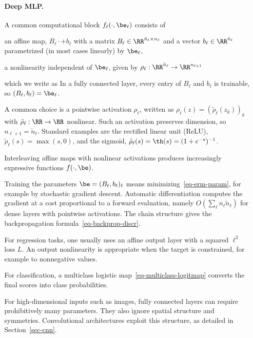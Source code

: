    
\paragraph{Deep MLP.}

A common computational block $f_\ell(\cdot,\be_\ell)$ consists of
\begin{rs}
	\item an affine map, $B_\ell \cdot + b_\ell$ with a matrix $B_\ell \in \RR^{\tilde n_{\ell} \times n_\ell}$ and a vector $b_\ell \in \RR^{\tilde n_\ell}$ parametrized (in most cases linearly) by $\be_\ell$,
	\item a nonlinearity independent of $\be_\ell$, given by $\rho_\ell : \RR^{\tilde n_{\ell}} \rightarrow \RR^{n_{\ell+1}}$
\end{rs}
which we write as
In a fully connected layer, every entry of $B_\ell$ and $b_\ell$ is trainable, so $(B_\ell,b_\ell)=\be_\ell$.
 
A common choice is a pointwise activation $\rho_\ell$, written as $\rho_\ell(z)=(\tilde\rho_\ell(z_k))_k$ with $\tilde\rho_\ell : \RR \rightarrow \RR$ nonlinear. Such an activation preserves dimension, so $n_{\ell+1}=\tilde n_\ell$. Standard examples are the rectified linear unit (ReLU), $\tilde\rho_\ell(s)=\max(s,0)$, and the sigmoid, $\tilde\rho_\ell(s)=\th(s) = (1+e^{-s})^{-1}$.

Interleaving affine maps with nonlinear activations produces increasingly expressive functions $f(\cdot,\be)$.

Training the parameters $\be = (B_\ell,b_\ell)_\ell$ means minimizing~\eqref{eq-erm-param}, for example by stochastic gradient descent. Automatic differentiation computes the gradient at a cost proportional to a forward evaluation, namely $O(\sum_\ell n_\ell\tilde n_\ell)$ for dense layers with pointwise activations. The chain structure gives the backpropagation formula~\eqref{eq-backprop-discr}.

For regression tasks, one usually uses an affine output layer with a squared $\ell^2$ loss $L$. An output nonlinearity is appropriate when the target is constrained, for example to nonnegative values.
 
For classification, a multiclass logistic map~\eqref{eq-multiclass-logitmap} converts the final scores into class probabilities.

For high-dimensional inputs such as images, fully connected layers can require prohibitively many parameters. They also ignore spatial structure and symmetries. Convolutional architectures exploit this structure, as detailed in Section~\ref{sec-cnn}.


